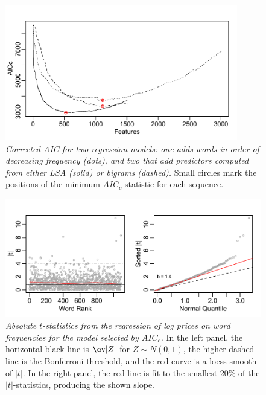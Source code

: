 \documentclass[12pt]{article}
\begin{document}
\begin{figure}
\caption{  \label{fig:aic}  
  {\sl Corrected AIC for two regression models: one adds words in order of decreasing frequency (dots), and two that add predictors computed from either LSA (solid) or bigrams (dashed).}  Small circles mark the positions of the minimum $AIC_c$ statistic for each sequence.}
  \centerline{ \includegraphics[width=4in]{figures/aic.pdf} }
\end{figure}


\begin{figure}
\caption{  \label{fig:wordtstats}  
  {\sl Absolute $t$-statistics from the regression of log prices on word frequencies for the model selected by $AIC_c$.}  In the left panel, the horizontal black line is $\ev |Z|$ for $Z \sim N(0,1)$,  the higher dashed line is the Bonferroni threshold, and the red curve is a loess smooth of $|t|$.  In the right panel, the red line is fit to the smallest 20\% of the $|t|$-statistics, producing the shown slope.}
  \centerline{ \includegraphics[width=5in]{figures/word_tstats.pdf} }
\end{figure}
\end{document}
